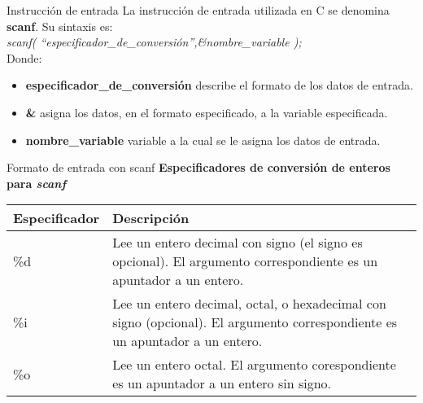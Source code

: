 \begin{frame}[t]{Instrucción de entrada}
La instrucción de entrada utilizada en C se denomina \textbf{scanf}. Su sintaxis es:\\
\textit{scanf( ``especificador\_de\_conversión'',\&nombre\_variable );}\\
Donde:
\begin{itemize}
	\item \textbf{especificador\_de\_conversión} describe el formato de los datos de entrada.
	\item \textbf{\&} asigna los datos, en el formato especificado, a la variable especificada.
	\item \textbf{nombre\_variable} variable a la cual se le asigna los datos de entrada.
\end{itemize}
\end{frame}

\begin{frame}[t]{Formato de entrada con scanf}
\textbf{Especificadores de conversi\'on de enteros para \textit{scanf}}
\vspace{-2mm}
\small
\begin{center}
\begin{tabular}{lp{6cm}}
	\toprule
	\textbf{Especificador} & \textbf{Descripci\'on}\\
	\midrule
	\%d & Lee un entero decimal con signo (el signo es opcional). El argumento correspondiente es un apuntador a un entero. \\
	\%i & Lee un entero decimal, octal, o hexadecimal con signo (opcional). El argumento correspondiente es un apuntador a un entero.\\
	\%o & Lee un entero octal. El argumento corespondiente es un apuntador a un entero sin signo.\\
	\bottomrule
\end{tabular}
\end{center}
\end{frame}

